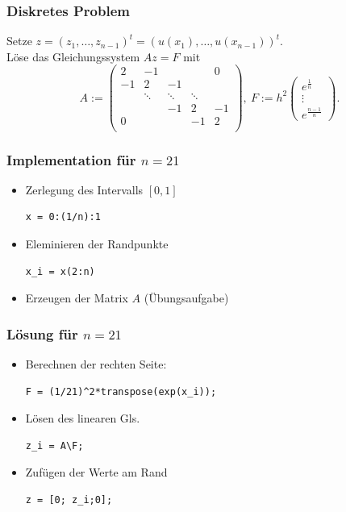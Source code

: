 \documentclass[hyperref={xetex}]{beamer}
\begin{document}
%
%
\begin{frame}[fragile]\frametitle{Diskretes Problem}

Setze $z=(z_1,\dots ,z_{n-1})^t=(u(x_1), \dots ,u(x_{n-1}))^t$. \\

Löse das Gleichungssystem  $Az=F$  mit 
\[ A:= 
\left( \begin{array} {ccccccc}
 2 & -1 &  & &   0 \\
-1 & 2  & -1 &    & \\ 
   & \ddots & \ddots & \ddots   &\\
   & &  -1 & 2  & -1  \\ 
0 &  &    & -1 & 2 \\
\end{array} \right), \  F:=
h^2 \left( \begin{array}{c} e^\frac{1}{n}\\   \vdots \\ e^\frac{n-1}{n}
\end{array} \right) .
\] 
\end{frame}
%
%
\begin{frame}[fragile]\frametitle{Implementation für $n=21$}
\begin{itemize}
\item Zerlegung des Intervalls $[0,1]$
\begin{lstlisting}
x = 0:(1/n):1
\end{lstlisting}
\item Eleminieren der Randpunkte
\begin{lstlisting}
x_i = x(2:n)
\end{lstlisting}
\item Erzeugen der Matrix $A$ (Übungsaufgabe)
\end{itemize}
\end{frame}
%
%
\begin{frame}[fragile]\frametitle{Lösung für $n=21$}
\begin{itemize}
\item Berechnen der rechten Seite:
\begin{lstlisting}
F = (1/21)^2*transpose(exp(x_i));
\end{lstlisting}
\item Lösen des linearen Gls.\\
\begin{lstlisting}
z_i = A\F;
\end{lstlisting}
\item Zufügen der Werte am Rand
\begin{lstlisting}
z = [0; z_i;0];
\end{lstlisting}
\end{itemize}
\end{frame}
\end{document}
